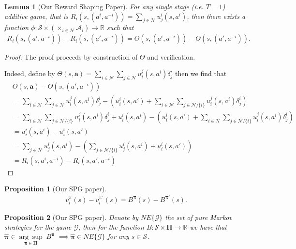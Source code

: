 \documentclass[12pt]{article}
\newtheorem{proof}{Proof}
\newtheorem{proposition}{Proposition}
\newtheorem{lemma}{Lemma}
\begin{document}
\begin{lemma}[Our Reward Shaping Paper]  
For any single stage (i.e. $T=1$) additive game, that is   $R_i(s,(a^i,a^{-i}))=\sum_{j\in\mathcal{N}}u^i_j(s,a^i)$, then there exists a function $\phi:\mathcal{S}\times \left(\times_{i\in\mathcal{N}}\mathcal{A}_i\right)\to \mathbb{R}$ such that
\begin{align*}
    R_i(s,(a^i,a^{-i}))-R_i(s,(a',a^{-i}))=\Theta(s,(a^i,a^{-i}))-\Theta(s,(a',a^{-i})).
\end{align*}
\end{lemma}
\begin{proof}
The proof proceeds by construction of $\Theta$ and verification.

Indeed, define by $\Theta(s,\boldsymbol{a})=\sum_{i\in\mathcal{N}}\sum_{j\in\mathcal{N}}u^j_i(s,a^i)\delta^i_j$ then we find that
\begin{align*}
&\Theta(s,\boldsymbol{a})- \Theta(s,(a',a^{-i}))
\\&= \sum_{i\in\mathcal{N}}\sum_{j\in\mathcal{N}}u^j_i(s,a^i)\delta^i_j-\left(u^i_i(s,a')+\sum_{i\in\mathcal{N}}\sum_{j\in\mathcal{N}/\{i\}}u^j_i(s,a^i)\delta^i_j\right)
\\&= \sum_{i\in\mathcal{N}}\sum_{j\in\mathcal{N}/\{i\}}u^j_i(s,a^i)\delta^i_j+u^i_i(s,a^i)-\left(u^i_i(s,a')+\sum_{i\in\mathcal{N}}\sum_{j\in\mathcal{N}/\{i\}}u^j_i(s,a^i)\delta^i_j\right)
\\&=u^i_i(s,a^i)-u^i_i(s,a')
\\&=\sum_{j\in\mathcal{N}}u^i_j(s,a^i)-\left(\sum_{j\in\mathcal{N}/\{i\}}u^i_j(s,a^i)+u^i_i(s,a')\right)
\\&=R_i(s,a^i,a^{-i})-R_i(s,a',a^{-i}) 
\end{align*}
\end{proof}

\begin{proposition}[Our SPG paper]\label{dpg_proposition}
\begin{align}
 v^{\boldsymbol{\pi}}_i(s)-v^{\boldsymbol{\pi'}}_i(s)
=B^{\boldsymbol{\pi}}(s)-B^{\boldsymbol{\pi'}}(s).\label{potential_relation_proof}
\end{align}    
\end{proposition}

\begin{proposition}[Our SPG paper]\label{reduction_prop}
Denote by $NE\{\mathcal{G}\}$ the set of pure Markov strategies for the game $\mathcal{G}$, then for the function $B:\mathcal{S}\times \boldsymbol{\Pi}\to\mathbb{R}$ we have that $
\boldsymbol{\hat{\pi}}\in \underset{{\boldsymbol{{\pi}}}\in\boldsymbol{\Pi}}{\arg\sup}\;B^{\boldsymbol{{\pi}}}\;\implies \boldsymbol{\hat{\pi}}\in NE\{\mathcal{G}\}
$ for any $s\in \mathcal{S}$.
\end{proposition}
\end{document}
